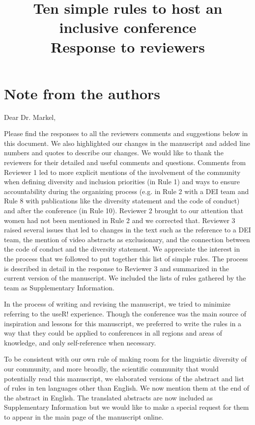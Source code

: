 \documentclass{article}
\title{Ten simple rules to host an inclusive conference\\ \vspace{0.5cm}
\textbf{Response to reviewers}}
\author{}
\date{}
\begin{document}
\maketitle

\section*{Note from the authors}

Dear Dr. Markel, 

Please find the responses to all the reviewers comments and suggestions below in this document. We also highlighted our changes in the manuscript and added line numbers and quotes to describe our changes. 
We would like to thank the reviewers for their detailed and useful comments and questions.
Comments from Reviewer 1 led to more explicit mentions of the involvement of the community when defining diversity and inclusion priorities (in Rule 1) and ways to ensure accountability during the organizing process (e.g. in Rule 2 with a DEI team and Rule 8 with publications like the diversity statement and the code of conduct) and after the conference (in Rule 10). 
Reviewer 2 brought to our attention that women had not been mentioned in Rule 2 and we corrected that. 
Reviewer 3 raised several issues that led to changes in the text such as the reference to a DEI team, the mention of video abstracts as exclusionary, and the connection between the code of conduct and the diversity statement. 
We appreciate the interest in the process that we followed to put together this list of simple rules. The process is described in detail in the response to Reviewer 3 and summarized in the current version of the manuscript. 
We included the lists of rules gathered by the team as Supplementary Information. 

In the process of writing and revising the manuscript, we tried to minimize referring to the useR! experience. Though the conference was the main source of inspiration and lessons for this manuscript, we preferred to write the rules in a way that they could be applied to conferences in all regions and areas of knowledge, and only self-reference when necessary. 

To be consistent with our own rule of making room for the linguistic diversity of our community, and more broadly, the scientific community that would potentially read this manuscript, we elaborated versions of the abstract and list of rules in ten languages other than English. We now mention them at the end of the abstract in English. The translated abstracts are now included as Supplementary Information but we would like to make a special request for them to appear in the main page of the manuscript online.  
\end{document}
